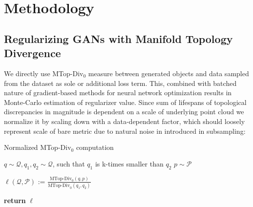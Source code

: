\chapter{Methodology}

\section{Regularizing GANs with Manifold Topology Divergence}

We directly use MTop-Div${}_0$ measure between generated objects and data sampled from the dataset as sole or additional loss term. This, combined with batched nature of gradient-based methods for neural network optimization results in Monte-Carlo estimation of regularizer value. Since sum of lifespans of topological discrepancies  in magnitude is dependent on a scale of underlying point cloud we normalize it by scaling down with a data-dependent factor, which should loosely represent scale of bare metric due to natural noise in introduced in subsampling:

\begin{algorithm}[h!]
\caption{Normalized MTop-Div${}_0$ computation}
\SetAlgoLined
{}

$q \sim \mathcal{Q}, q_1, q_2 \sim \mathcal{Q}$, such that $q_1$ is k-times smaller than $q_2$
$p \sim \mathcal{P}$

$\ell(\mathcal{Q}, \mathcal{P})$ := $\frac{\text{MTop-Div}_0(q, p)}{\text{MTop-Div}_0(q_1, q_2)}$

\textbf{return} $\ell$
\label{algo:normedmtopdiv}
\end{algorithm}


